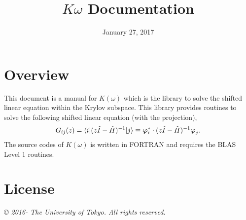 \documentclass[letterpaper,10pt,dvipdfmx,openany]{sphinxmanual}
\title{$K\omega$ Documentation}
\date{January 27, 2017}
\author{}
\begin{document}
\maketitle
\tableofcontents
{}\label{index::doc}



\chapter{Overview}
\label{komega_overview_en:overview}\label{komega_overview_en::doc}\label{komega_overview_en:welcome-to-s-documentation}
This document is a manual for \(K(\omega)\) which is the library to
solve the shifted linear equation within the Krylov subspace.
This library provides routines to solve the following shifted linear equation
(with the projection),
\label{komega_overview_en:shiftedeq}\begin{gather}
\begin{split}\begin{align}
  G_{i j}(z) = \langle i | (z {\hat I} -{\hat H})^{-1}| j \rangle \equiv
  {\boldsymbol \varphi}_i^{*} \cdot (z{\hat I}-{\hat H})^{-1} {\boldsymbol \varphi}_j.
  \end{align}\end{split}\notag
\end{gather}
The source codes of \(K(\omega)\) is written in FORTRAN
and requires the BLAS Level 1 routines.


\chapter{License}
\label{komega_copyright_en::doc}\label{komega_copyright_en:license}
\emph{© 2016- The University of Tokyo. All rights reserved.}
\end{document}
